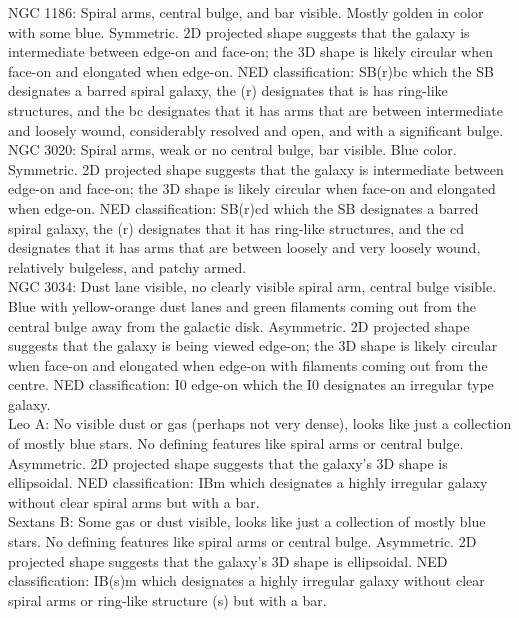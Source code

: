 \documentclass[10pt,letterpaper]{article}
\begin{document}
NGC 1186: Spiral arms, central bulge, and bar visible. Mostly golden in color with some blue. Symmetric. 2D projected shape suggests that the galaxy is intermediate between edge-on and face-on; the 3D shape is likely circular when face-on and elongated when edge-on. NED classification: SB(r)bc which the SB designates a barred spiral galaxy, the (r) designates that is has ring-like structures, and the bc designates that it has arms that are between intermediate and loosely wound, considerably resolved and open, and with a significant bulge.\\

NGC 3020: Spiral arms, weak or no central bulge, bar visible. Blue color. Symmetric. 2D projected shape suggests that the galaxy is intermediate between edge-on and face-on; the 3D shape is likely circular when face-on and elongated when edge-on. NED classification: SB(r)cd which the SB designates a barred spiral galaxy, the (r) designates that it has ring-like structures, and the cd designates that it has arms that are between loosely and very loosely wound, relatively bulgeless, and patchy armed.\\

NGC 3034: Dust lane visible, no clearly visible spiral arm, central bulge visible. Blue with yellow-orange dust lanes and green filaments coming out from the central bulge away from the galactic disk. Asymmetric. 2D projected shape suggests that the galaxy is being viewed edge-on; the 3D shape is likely circular when face-on and elongated when edge-on with filaments coming out from the centre. NED classification: I0 edge-on which the I0 designates an irregular type galaxy.\\

Leo A: No visible dust or gas (perhaps not very dense), looks like just a collection of mostly blue stars. No defining features like spiral arms or central bulge. Asymmetric. 2D projected shape suggests that the galaxy's 3D shape is ellipsoidal. NED classification: IBm which designates a highly irregular galaxy without clear spiral arms but with a bar.\\

Sextans B: Some gas or dust visible, looks like just a collection of mostly blue stars. No defining features like spiral arms or central bulge. Asymmetric. 2D projected shape suggests that the galaxy's 3D shape is ellipsoidal. NED classification: IB(s)m which designates a highly irregular galaxy without clear spiral arms or ring-like structure (s) but with a bar.\\
\end{document}
